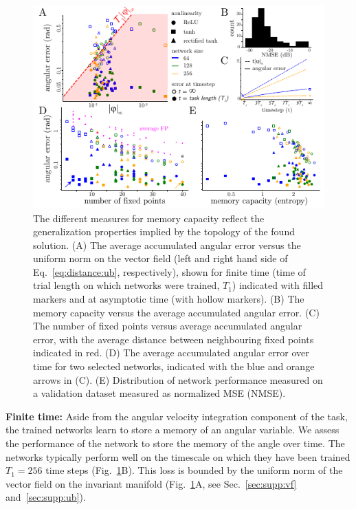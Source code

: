 \documentclass{article} %
\newcommand{\ptitle}[1]{\textbf{#1:}\xspace}
\newcounter{ct}
\theoremstyle{definition}
\theoremstyle{remark}
\begin{document}
\begin{figure}[tbhp]
  \centering
  \includegraphics[width=\textwidth]{angular_losses2}
  \caption{The different measures for memory capacity reflect the generalization properties implied by the topology of the found solution.
  (A) The average accumulated angular error versus the uniform norm on the vector field (left and right hand side of Eq.~\ref{eq:distance:ub}, respectively), shown for finite time (time of trial length on which networks were trained, \(T_1\)) indicated with filled markers and at asymptotic time (with hollow markers).
  (B) The memory capacity versus the average accumulated angular error.
  (C) The number of fixed points versus average accumulated angular error, with the average distance between neighbouring fixed points indicated in red.
  (D) The average accumulated angular error over time for two selected networks, indicated with the blue and orange arrows in (C).
  (E) Distribution of network performance measured on a validation dataset measured as normalized MSE (NMSE).
  }\label{fig:angular_loss}
\end{figure}


\ptitle{Finite time}
Aside from the angular velocity integration component of the task, the trained networks learn to store a memory of an angular variable.
We assess the performance of the network to store the memory of the angle over time.
The networks typically perform well on the timescale on which they have been trained \(T_1=256\) time steps (Fig.~\ref{fig:angular_loss}B).
This loss is bounded by the uniform norm of the vector field on the invariant manifold (Fig.~\ref{fig:angular_loss}A,  see Sec.~\ref{sec:supp:vf} and~\ref{sec:supp:ub}).
\end{document}
